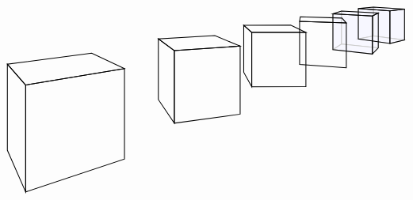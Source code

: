 \begin{solution}
\begin{equation*}
\begin{tikzpicture}[scale=12, thick]
      \draw[black!20,fill=blue!3] (0.3850,-0.1012) -- (0.3850,-0.2025) -- (0.4094,-0.1870) -- (0.4094,-0.0935) -- cycle;
      \draw[black!20,fill=blue!3] (0.5134,-0.0988) -- (0.4094,-0.0935) -- (0.4094,-0.1870) -- (0.5134,-0.1976) -- cycle;
      \draw[black!20,fill=blue!3] (0.4967,-0.2150) -- (0.5134,-0.1976) -- (0.4094,-0.1870) -- (0.3850,-0.2025) -- cycle;

      \draw[black!20,fill=blue!3] (0.4569,-0.0862) -- (0.4569,-0.1724) -- (0.5000,-0.1639) -- (0.5000,-0.0820) -- cycle;
      \draw[black!20,fill=blue!3] (0.5877,-0.0877) -- (0.5000,-0.0820) -- (0.5000,-0.1639) -- (0.5877,-0.1754) -- cycle;
      \draw[black!20,fill=blue!3] (0.5463,-0.1852) -- (0.5877,-0.1754) -- (0.5000,-0.1639) -- (0.4569,-0.1724) -- cycle;

      \draw (-0.4848,-0.3030) -- (-0.4848,-0.6061) -- (-0.5366,-0.4878) -- (-0.5366,-0.2439) -- cycle;
      \draw (-0.2051,-0.2564) -- (-0.2051,-0.5128) -- (-0.4848,-0.6061) -- (-0.4848,-0.3030) -- cycle;
      \draw (-0.2051,-0.2564) -- (-0.4848,-0.3030) -- (-0.5366,-0.2439) -- (-0.2979,-0.2128) -- cycle;

      \draw (-0.0640,-0.2055) -- (-0.0640,-0.4111) -- (-0.1092,-0.3442) -- (-0.1092,-0.1721) -- cycle;
      \draw (0.1224,-0.1927) -- (0.1224,-0.3855) -- (-0.0640,-0.4111) -- (-0.0640,-0.2055) -- cycle;
      \draw (0.1224,-0.1927) -- (-0.0640,-0.2055) -- (-0.1092,-0.1721) -- (0.0508,-0.1630) -- cycle;

      \draw (0.1552,-0.1540) -- (0.1552,-0.3080) -- (0.1325,-0.2669) -- (0.1325,-0.1335) -- cycle;
      \draw (0.3085,-0.1537) -- (0.3085,-0.3073) -- (0.1552,-0.3080) -- (0.1552,-0.1540) -- cycle;
      \draw (0.3085,-0.1537) -- (0.1552,-0.1540) -- (0.1325,-0.1335) -- (0.2654,-0.1332) -- cycle;

      \draw (0.4229,-0.1270) -- (0.4229,-0.2540) -- (0.2907,-0.2448) -- (0.2907,-0.1224) -- cycle;
      \draw (0.4229,-0.1270) -- (0.2907,-0.1224) -- (0.2925,-0.1096) -- (0.4105,-0.1132) -- cycle;

      \draw (0.4967,-0.1075) -- (0.5134,-0.0988) -- (0.5134,-0.1976) -- (0.4967,-0.2150) -- cycle;
      \draw (0.4967,-0.1075) -- (0.4967,-0.2150) -- (0.3850,-0.2025) -- (0.3850,-0.1012) -- cycle;
      \draw (0.4967,-0.1075) -- (0.3850,-0.1012) -- (0.4094,-0.0935) -- (0.5134,-0.0988) -- cycle;

      \draw (0.5463,-0.0926) -- (0.5877,-0.0877) -- (0.5877,-0.1754) -- (0.5463,-0.1852) -- cycle;
      \draw (0.5463,-0.0926) -- (0.5463,-0.1852) -- (0.4569,-0.1724) -- (0.4569,-0.0862) -- cycle;
      \draw (0.5463,-0.0926) -- (0.4569,-0.0862) -- (0.5000,-0.0820) -- (0.5877,-0.0877) -- cycle;


\end{tikzpicture}
\end{equation*}
\end{solution}
